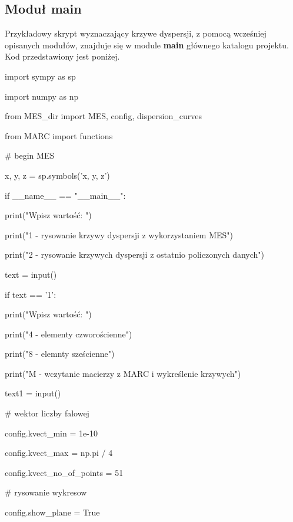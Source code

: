 \subsection{Moduł main}
\label{cha:main}

Przykładowy skrypt wyznaczający krzywe dyspersji, z pomocą wcześniej opisanych modułów, znajduje się w module \textbf{main} głównego katalogu projektu. Kod przedstawiony jest poniżej.

\vspace{3mm}
import sympy as sp

import numpy as np

from MES\_dir import MES, config, dispersion\_curves

from MARC import functions

\vspace{3mm}
\# begin MES

x, y, z = sp.symbols('x, y, z')

if \_\_name\_\_ == "\_\_main\_\_":

\vspace{3mm}
    print("Wpisz wartość: ")

    print("1 - rysowanie krzywy dyspersji z wykorzystaniem MES")

    print("2 - rysowanie krzywych dyspersji z ostatnio policzonych danych")

    text = input()

\vspace{3mm}
    if text == '1':

\vspace{3mm}
        print("Wpisz wartość: ")

        print("4 - elementy czworościenne")

        print("8 - elemnty sześcienne")

        print("M - wczytanie macierzy z MARC i wykreślenie krzywych")

        text1 = input()

\vspace{3mm}
        \# wektor liczby falowej

        config.kvect\_min = 1e-10

        config.kvect\_max = np.pi / 4

        config.kvect\_no\_of\_points = 51

\vspace{3mm}
        \# rysowanie wykresow

\vspace{3mm}
        config.show\_plane = True

